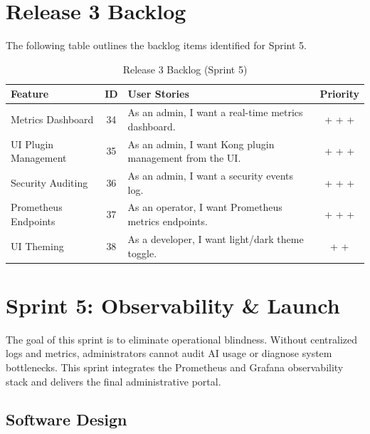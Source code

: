 \section{Release 3 Backlog}

The following table outlines the backlog items identified for Sprint 5.

\begin{table}[H]
\centering
\renewcommand{\arraystretch}{1.3}
\footnotesize
\begin{tabularx}{\textwidth}{| >{\raggedright\arraybackslash}p{3.5cm} | c | >{\raggedright\arraybackslash}X | c |}
\hline
\rowcolor{rowgray}
\textbf{Feature} & \textbf{ID} & \textbf{User Stories} & \textbf{Priority} \\
\hline
Metrics Dashboard & 34 & As an admin, I want a real-time metrics dashboard. & + + + \\
\hline
UI Plugin Management & 35 & As an admin, I want Kong plugin management from the UI. & + + + \\
\hline
Security Auditing & 36 & As an admin, I want a security events log. & + + + \\
\hline
Prometheus Endpoints & 37 & As an operator, I want Prometheus metrics endpoints. & + + + \\
\hline
UI Theming & 38 & As a developer, I want light/dark theme toggle. & + + \\
\hline
\end{tabularx}
\caption{Release 3 Backlog (Sprint 5)}
\label{tab:release3_backlog}
\end{table}


\section{Sprint 5: Observability \& Launch}

The goal of this sprint is to eliminate operational blindness. Without centralized logs and metrics, administrators cannot audit AI usage or diagnose system bottlenecks. This sprint integrates the Prometheus and Grafana observability stack and delivers the final administrative portal.

\subsection{Software Design}

